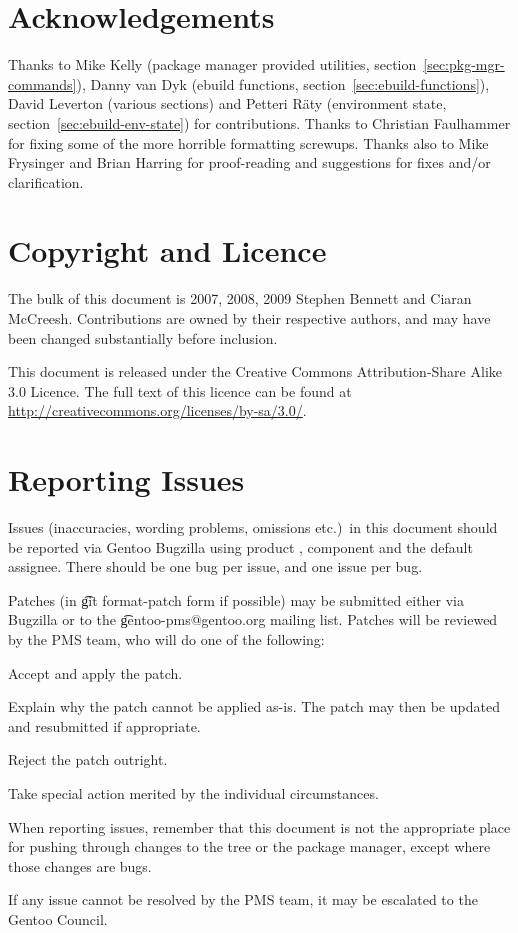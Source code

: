 \section*{Acknowledgements}

Thanks to Mike Kelly (package manager provided utilities, section~\ref{sec:pkg-mgr-commands}), Danny van
Dyk (ebuild functions, section~\ref{sec:ebuild-functions}), David Leverton (various sections) and
Petteri Räty (environment state, section~\ref{sec:ebuild-env-state}) for contributions. Thanks to
Christian Faulhammer for fixing some of the more horrible formatting screwups. Thanks also to Mike
Frysinger and Brian Harring for proof-reading and suggestions for fixes and/or clarification.

\section*{Copyright and Licence}

The bulk of this document is \textcopyright{} 2007, 2008, 2009 Stephen Bennett and Ciaran McCreesh.
Contributions are owned by their respective authors, and may have been changed substantially before
inclusion.

This document is released under the Creative Commons Attribution-Share Alike 3.0 Licence. The full
text of this licence can be found at \url{http://creativecommons.org/licenses/by-sa/3.0/}.

\section*{Reporting Issues}

Issues (inaccuracies, wording problems, omissions etc.)\ in this document should be reported via
Gentoo Bugzilla using product , component  and the default
assignee. There should be one bug per issue, and one issue per bug.

Patches (in \t{git format-patch} form if possible) may be submitted either via Bugzilla or to the
\t{gentoo-pms@gentoo.org} mailing list. Patches will be reviewed by the PMS team, who will do one of
the following:

\begin{compactitem}
\item Accept and apply the patch.
\item Explain why the patch cannot be applied as-is. The patch may then be updated and resubmitted
if \mbox{appropriate}.
\item Reject the patch outright.
\item Take special action merited by the individual circumstances.
\end{compactitem}

When reporting issues, remember that this document is not the appropriate place for pushing
through changes to the tree or the package manager, except where those changes are bugs.

If any issue cannot be resolved by the PMS team, it may be escalated to the Gentoo Council.


